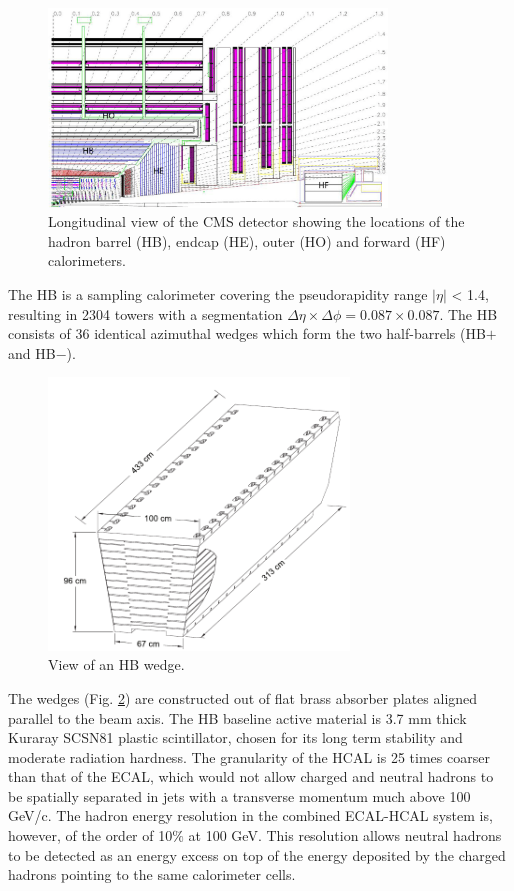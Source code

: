 \begin{figure}[H]
  \caption{Longitudinal view of the CMS detector showing the locations of the hadron barrel
  (HB), endcap (HE), outer (HO) and forward (HF) calorimeters. \label{fig:hcal1}}
  \centering
\includegraphics[width=9cm]{CMS_chapter_plots/hcal1}
\end{figure}

The HB is a sampling calorimeter covering the pseudorapidity range $|\eta|$ < 1.4, resulting in 2304 towers with a segmentation $\Delta\eta\times\Delta\phi=0.087\times 0.087$. The HB consists of 36 identical azimuthal wedges which form the two half-barrels (HB$+$ and HB$-$).

\begin{figure}[H]
  \caption{View of an HB wedge. \label{fig:hcal3}}
  \centering
\includegraphics[width=8cm]{CMS_chapter_plots/hcal3}
\end{figure}

The wedges (Fig. \ref{fig:hcal3}) are constructed out of flat brass absorber plates aligned parallel to the beam axis.
The HB baseline active material is 3.7 mm thick Kuraray SCSN81 plastic scintillator, chosen for its long term stability and moderate radiation hardness. The granularity of the HCAL is 25 times coarser than that of
the ECAL, which would not allow charged and neutral hadrons to be spatially separated in jets with a transverse momentum much above 100 GeV/c. The hadron energy resolution in the combined ECAL-HCAL system is, however, of the order of 10$\%$ at 100 GeV. This resolution allows neutral hadrons to be detected as an energy excess on top of the energy deposited by the charged hadrons pointing to the same calorimeter cells. 

